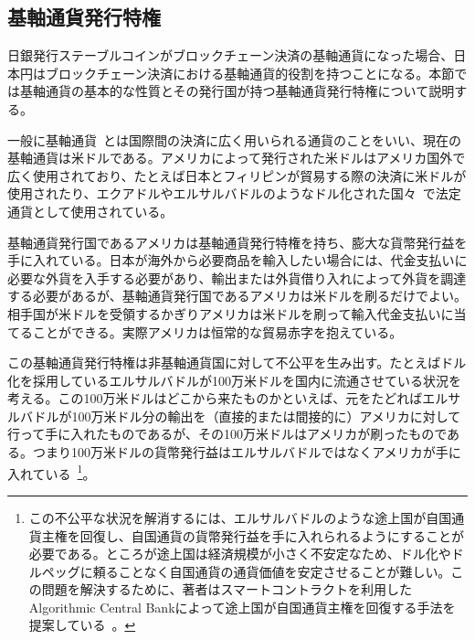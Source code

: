 \documentclass[dvipdfmx,a4paper]{jsarticle}
\begin{document}
\subsection{基軸通貨発行特権}

日銀発行ステーブルコインがブロックチェーン決済の基軸通貨になった場合、日本円はブロックチェーン決済における基軸通貨的役割を持つことになる。本節では基軸通貨の基本的な性質とその発行国が持つ基軸通貨発行特権について説明する。

一般に基軸通貨~\cite{monetarytheory,robert2004international}とは国際間の決済に広く用いられる通貨のことをいい、現在の基軸通貨は米ドルである。アメリカによって発行された米ドルはアメリカ国外で広く使用されており、たとえば日本とフィリピンが貿易する際の決済に米ドルが使用されたり、エクアドルやエルサルバドルのようなドル化された国々~\cite{calvo2002dollarization,selgin2005currency}で法定通貨として使用されている。

基軸通貨発行国であるアメリカは基軸通貨発行特権を持ち、膨大な貨幣発行益を手に入れている。日本が海外から必要商品を輸入したい場合には、代金支払いに必要な外貨を入手する必要があり、輸出または外貨借り入れによって外貨を調達する必要があるが、基軸通貨発行国であるアメリカは米ドルを刷るだけでよい。相手国が米ドルを受領するかぎりアメリカは米ドルを刷って輸入代金支払いに当てることができる。実際アメリカは恒常的な貿易赤字を抱えている。

この基軸通貨発行特権は非基軸通貨国に対して不公平を生み出す。たとえばドル化を採用しているエルサルバドルが100万米ドルを国内に流通させている状況を考える。この100万米ドルはどこから来たものかといえば、元をたどればエルサルバドルが100万米ドル分の輸出を（直接的または間接的に）アメリカに対して行って手に入れたものであるが、その100万米ドルはアメリカが刷ったものである。つまり100万米ドルの貨幣発行益はエルサルバドルではなくアメリカが手に入れている~\footnote{この不公平な状況を解消するには、エルサルバドルのような途上国が自国通貨主権を回復し、自国通貨の貨幣発行益を手に入れられるようにすることが必要である。ところが途上国は経済規模が小さく不安定なため、ドル化やドルペッグに頼ることなく自国通貨の通貨価値を安定させることが難しい。この問題を解決するために、著者はスマートコントラクトを利用したAlgorithmic Central Bankによって途上国が自国通貨主権を回復する手法を提案している~\cite{johnlawcoinacb}。}。
\end{document}
